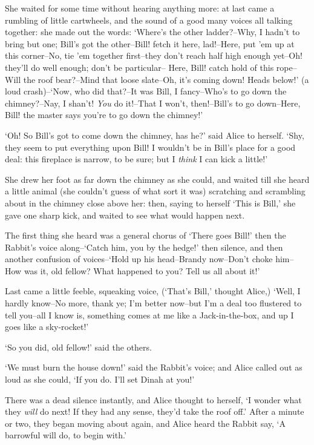   She waited for some time without hearing anything more:  at
last came a rumbling of little cartwheels, and the sound of a
good many voices all talking together:  she made out the words:
`Where's the other ladder?--Why, I hadn't to bring but one;
Bill's got the other--Bill! fetch it here, lad!--Here, put 'em up
at this corner--No, tie 'em together first--they don't reach half
high enough yet--Oh! they'll do well enough; don't be particular--
Here, Bill! catch hold of this rope--Will the roof bear?--Mind
that loose slate--Oh, it's coming down!  Heads below!' (a loud
crash)--`Now, who did that?--It was Bill, I fancy--Who's to go
down the chimney?--Nay, I shan't! {\it You} do it!--That I won't,
then!--Bill's to go down--Here, Bill! the master says you're to
go down the chimney!'

  `Oh! So Bill's got to come down the chimney, has he?' said
Alice to herself.  `Shy, they seem to put everything upon Bill!
I wouldn't be in Bill's place for a good deal:  this fireplace is
narrow, to be sure; but I {\it think} I can kick a little!'

  She drew her foot as far down the chimney as she could, and
waited till she heard a little animal (she couldn't guess of what
sort it was) scratching and scrambling about in the chimney close
above her:  then, saying to herself `This is Bill,' she gave one
sharp kick, and waited to see what would happen next.

  The first thing she heard was a general chorus of `There goes
Bill!' then the Rabbit's voice along--`Catch him, you by the
hedge!' then silence, and then another confusion of voices--`Hold
up his head--Brandy now--Don't choke him--How was it, old fellow?
What happened to you?  Tell us all about it!'

  Last came a little feeble, squeaking voice, (`That's Bill,'
thought Alice,) `Well, I hardly know--No more, thank ye; I'm
better now--but I'm a deal too flustered to tell you--all I know
is, something comes at me like a Jack-in-the-box, and up I goes
like a sky-rocket!'

  `So you did, old fellow!' said the others.

  `We must burn the house down!' said the Rabbit's voice; and
Alice called out as loud as she could, `If you do.  I'll set
Dinah at you!'

  There was a dead silence instantly, and Alice thought to
herself, `I wonder what they {\it will} do next!  If they had any
sense, they'd take the roof off.'  After a minute or two, they
began moving about again, and Alice heard the Rabbit say, `A
barrowful will do, to begin with.'

